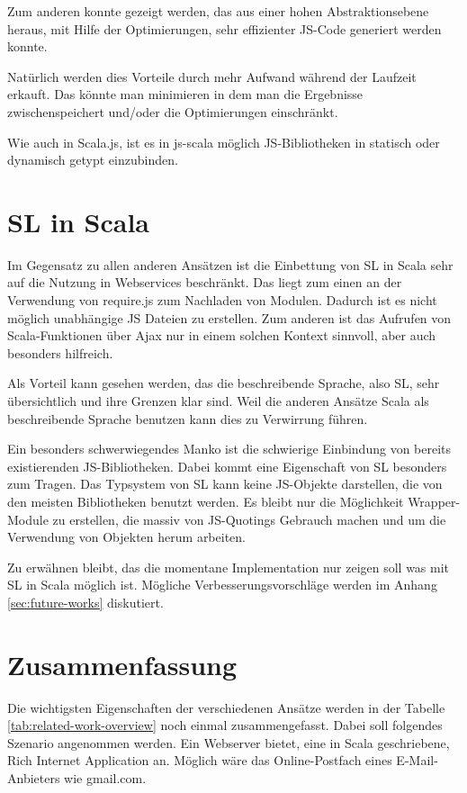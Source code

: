 \documentclass[12pt,bibtotoc]{scrreprt}
\begin{document}
Zum anderen konnte gezeigt werden, das aus einer hohen Abstraktionsebene heraus, mit Hilfe der Optimierungen, sehr effizienter JS-Code generiert werden konnte\cite{Richard-Foy2013}.

Natürlich werden dies Vorteile durch mehr Aufwand während der Laufzeit erkauft. Das könnte man minimieren in dem man die Ergebnisse zwischenspeichert und/oder die Optimierungen einschränkt.

Wie auch in Scala.js, ist es in js-scala möglich JS-Bibliotheken in statisch oder dynamisch getypt einzubinden.


\section{SL in Scala}

Im Gegensatz zu allen anderen Ansätzen ist die Einbettung von SL in Scala sehr auf die Nutzung in Webservices beschränkt. Das liegt zum einen an der Verwendung von require.js zum Nachladen von Modulen. Dadurch ist es nicht möglich unabhängige JS Dateien zu erstellen. Zum anderen ist das Aufrufen von Scala-Funktionen über Ajax nur in einem solchen Kontext sinnvoll, aber auch besonders hilfreich.

Als Vorteil kann gesehen werden, das die beschreibende Sprache, also SL, sehr übersichtlich und ihre Grenzen klar sind. Weil die anderen Ansätze Scala als beschreibende Sprache benutzen kann dies zu Verwirrung führen. 

Ein besonders schwerwiegendes Manko ist die schwierige Einbindung von bereits existierenden JS-Bibliotheken. Dabei kommt eine Eigenschaft von SL besonders zum Tragen. Das Typsystem von SL kann keine JS-Objekte darstellen, die von den meisten Bibliotheken benutzt werden. Es bleibt nur die Möglichkeit Wrapper-Module zu erstellen, die massiv von JS-Quotings Gebrauch machen und um die Verwendung von Objekten herum arbeiten.

Zu erwähnen bleibt, das die momentane Implementation nur zeigen soll was mit SL in Scala möglich ist. Mögliche Verbesserungsvorschläge werden im Anhang \ref{sec:future-works} diskutiert.

\section{Zusammenfassung}

Die wichtigsten Eigenschaften der verschiedenen Ansätze werden in der Tabelle \ref{tab:related-work-overview} noch einmal zusammengefasst. Dabei soll folgendes Szenario angenommen werden. Ein Webserver bietet, eine in Scala geschriebene, Rich Internet Application an. Möglich wäre das Online-Postfach eines E-Mail-Anbieters wie gmail.com.
\end{document}
